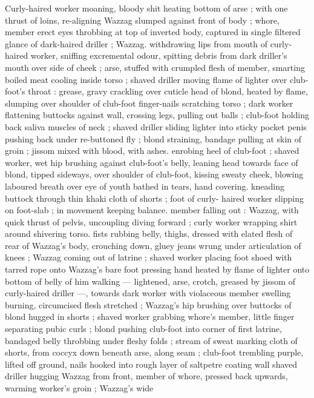 Curly-haired worker moaning, bloody shit heating bottom of arse ;
with one thrust of loins, re-aligning Wazzag slumped against front of
body ; whore, member erect eyes throbbing at top of inverted body,
captured in single filtered glance of dark-haired driller ; Wazzag.
withdrawing lips from mouth of curly-haired worker, sniffing
excremental odour, spitting debris from dark driller's mouth over side
of cheek ; arse, stuffed with crumpled flesh of member, smarting
boiled meat cooling inside torso ; shaved driller moving flame of
lighter over club-foot's throat : grease, gravy crackling over cuticle
head of blond, heated by flame, slumping over shoulder of club-foot
finger-nails scratching torso ; dark worker flattening buttocks against
wall, crossing legs, pulling out balls ; club-foot holding back saliva
muscles of neck ; shaved driller sliding lighter into sticky pocket
penis pushing back under re-buttoned fly ; blond straining, bandage
pulling at skin of groin ; jissom mixed with blood, with ashes.
enrobing heel of club-foot ; shaved worker, wet hip brushing against
club-foot's belly, leaning head towards face of blond, tipped
sideways, over shoulder of club-foot, kissing sweaty cheek, blowing
laboured breath over eye of youth bathed in tears, hand covering.
kneading buttock through thin khaki cloth of shorts ; foot of curly-
haired worker slipping on foot-slab ; in movement keeping balance.
member falling out : Wazzag, with quick thrust of pelvis, uncoupling
diving forward ; curly worker wrapping shirt around shivering torso.
fists rubbing belly, thighs, dressed with elated flesh of rear of
Wazzag's body, crouching down, gluey jeans wrung under
articulation of knees ; Wazzag coming out of latrine ; shaved worker
placing foot shoed with tarred rope onto Wazzag's bare foot
pressing hand heated by flame of lighter onto bottom of belly of him
walking --- lightened, arse, crotch, greased by jissom of curly-haired
driller ---, towards dark worker with violaceous member swelling
burning, circumcised flesh stretched ; Wazzag's hip brushing over
buttocks of blond hugged in shorts ; shaved worker grabbing
whore’s member, little finger separating pubic curls ; blond pushing
club-foot into corner of first latrine, bandaged belly throbbing under
fleshy folds ; stream of sweat marking cloth of shorts, from coccyx
down beneath arse, along seam ; club-foot trembling purple, lifted
off ground, nails hooked into rough layer of saltpetre coating wall
shaved driller hugging Wazzag from front, member of whore,
pressed back upwards, warming worker's groin ; Wazzag's wide
